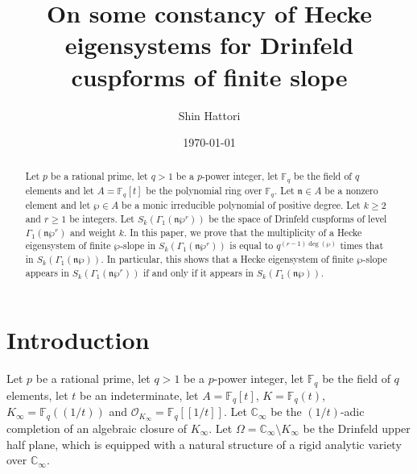 \documentclass[11pt]{amsart}
\theoremstyle{plain}
\theoremstyle{definition}
\newcommand{\cO}{\mathcal{O}}
\newcommand{\bF}{\mathbb{F}}
\newcommand{\frn}{\mathfrak{n}}
\newcommand{\Kinf}{K_\infty}
\newcommand{\Cinf}{\mathbb{C}_{\infty}}
\begin{document}
\title[Constancy of Hecke eigensystems for Drinfeld cuspforms]{On some constancy of Hecke eigensystems for Drinfeld cuspforms of finite slope}



\author{Shin Hattori}
\address{Department of Natural Sciences, Tokyo City University, 1-28-1 Tamazutsumi, Setagaya-ku, Tokyo 158-8557, Japan}
	
	


\date{\today}


\begin{abstract}
	Let $p$ be a rational prime, let $q>1$ be a $p$-power integer, let $\bF_q$ be the field of $q$ elements and let $A=\bF_q[t]$ be the polynomial ring over $
	\bF_q$. Let $\frn\in A$ be a nonzero element and let $\wp\in A$ be a monic irreducible polynomial of positive degree.
	Let $k\geq 2$ and $r\geq 1$ be integers.
	Let $S_k(\Gamma_1(\frn\wp^r))$ be the space of Drinfeld cuspforms of level $\Gamma_1(\frn\wp^r)$ and weight $k$. 
	In this paper, we prove that the multiplicity of a Hecke eigensystem of finite $\wp$-slope in $S_k(\Gamma_1(\frn\wp^r))$ is equal to $q^{(r-1)\deg(\wp)}$ times 
	that in $S_k(\Gamma_1(\frn\wp))$.
	In particular, this shows that a Hecke eigensystem of finite $\wp$-slope appears in $S_k(\Gamma_1(\frn\wp^r))$ if and only if it appears in 
	$S_k(\Gamma_1(\frn\wp))$.
\end{abstract}


\maketitle






\section{Introduction}

Let $p$ be a rational prime, let $q>1$ be a $p$-power integer, let $\bF_q$ be the field of $q$ elements, let $t$ be an indeterminate, let $A=\bF_q[t]$, $K=\bF_q(t)
$, $K_\infty=\bF_q((1/t))$ and $\cO_{\Kinf}=\bF_q[[1/t]]$. Let $\Cinf$ be the $(1/t)$-adic completion of an algebraic closure of $\Kinf$. Let $
\Omega=\Cinf\setminus \Kinf$ be the Drinfeld 
upper half plane, which is equipped with a natural structure of a rigid analytic variety over $\Cinf$. 
\end{document}
